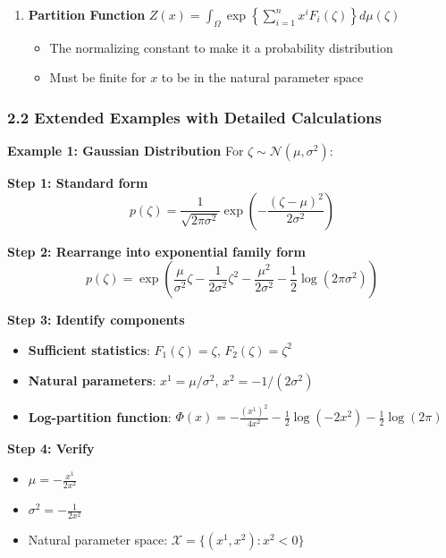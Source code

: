 \documentclass{amsart}
\theoremstyle{plain}
\theoremstyle{definition}
\theoremstyle{remark}
\begin{document}
\begin{enumerate}
\begin{itemize}
		\item Is the \textbf{cumulant generating function} of $F(\zeta)$
		\item Contains all information about the moments of the distribution
	\end{itemize}
	\item \textbf{Partition Function} $Z(x) = \int_{\Omega} \exp\left\{\sum_{i=1}^n x^i F_i(\zeta)\right\} d\mu(\zeta)$
	\begin{itemize}
		\item The normalizing constant to make it a probability distribution
		\item Must be finite for $x$ to be in the natural parameter space
	\end{itemize}
\end{enumerate}

\subsubsection{2.2 Extended Examples with Detailed Calculations}

\textbf{Example 1: Gaussian Distribution}
For $\zeta \sim \mathcal{N}(\mu, \sigma^2)$:

\textbf{Step 1: Standard form}
\[
p(\zeta) = \frac{1}{\sqrt{2\pi\sigma^2}} \exp\left(-\frac{(\zeta - \mu)^2}{2\sigma^2}\right)
\]

\textbf{Step 2: Rearrange into exponential family form}
\[
p(\zeta) = \exp\left(\frac{\mu}{\sigma^2}\zeta - \frac{1}{2\sigma^2}\zeta^2 - \frac{\mu^2}{2\sigma^2} - \frac{1}{2}\log(2\pi\sigma^2)\right)
\]

\textbf{Step 3: Identify components}

\begin{itemize}
	\item \textbf{Sufficient statistics}: $F_1(\zeta) = \zeta$, $F_2(\zeta) = \zeta^2$
	\item \textbf{Natural parameters}: $x^1 = \mu/\sigma^2$, $x^2 = -1/(2\sigma^2)$
	\item \textbf{Log-partition function}: $\Phi(x) = -\frac{(x^1)^2}{4x^2} - \frac{1}{2}\log(-2x^2) - \frac{1}{2}\log(2\pi)$
\end{itemize}

\textbf{Step 4: Verify}

\begin{itemize}
	\item $\mu = -\frac{x^1}{2x^2}$
	\item $\sigma^2 = -\frac{1}{2x^2}$
	\item Natural parameter space: $\mathcal{X} = \{(x^1, x^2) : x^2 < 0\}$
\end{itemize}
\end{document}
